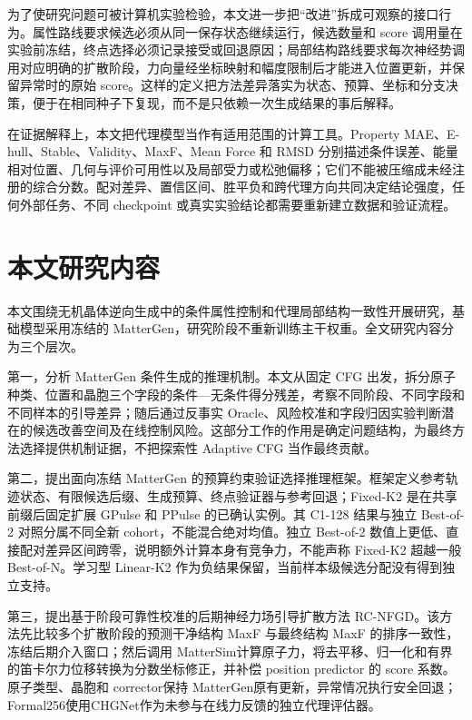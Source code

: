 为了使研究问题可被计算机实验检验，本文进一步把``改进''拆成可观察的接口行为。属性路线要求候选必须从同一保存状态继续运行，候选数量和 score 调用量在实验前冻结，终点选择必须记录接受或回退原因；局部结构路线要求每次神经势调用对应明确的扩散阶段，力向量经坐标映射和幅度限制后才能进入位置更新，并保留异常时的原始 score。这样的定义把方法差异落实为状态、预算、坐标和分支决策，便于在相同种子下复现，而不是只依赖一次生成结果的事后解释。

在证据解释上，本文把代理模型当作有适用范围的计算工具。Property MAE、E-hull、Stable、Validity、MaxF、Mean Force 和 RMSD 分别描述条件误差、能量相对位置、几何与评价可用性以及局部受力或松弛偏移；它们不能被压缩成未经注册的综合分数。配对差异、置信区间、胜平负和跨代理方向共同决定结论强度，任何外部任务、不同 checkpoint 或真实实验结论都需要重新建立数据和验证流程。

\section{本文研究内容}

本文围绕无机晶体逆向生成中的条件属性控制和代理局部结构一致性开展研究，基础模型采用冻结的 MatterGen，研究阶段不重新训练主干权重。全文研究内容分为三个层次。

第一，分析 MatterGen 条件生成的推理机制。本文从固定 CFG 出发，拆分原子种类、位置和晶胞三个字段的条件---无条件得分残差，考察不同阶段、不同字段和不同样本的引导差异；随后通过反事实 Oracle、风险校准和字段归因实验判断潜在的候选改善空间及在线控制风险。这部分工作的作用是确定问题结构，为最终方法选择提供机制证据，不把探索性 Adaptive CFG 当作最终贡献。

第二，提出面向冻结 MatterGen 的预算约束验证选择推理框架。框架定义参考轨迹状态、有限候选后缀、生成预算、终点验证器与参考回退；Fixed-K2 是在共享前缀后固定扩展 GPulse 和 PPulse 的已确认实例。其 C1-128 结果与独立 Best-of-2 对照分属不同全新 cohort，不能混合绝对均值。独立 Best-of-2 数值上更低、直接配对差异区间跨零，说明额外计算本身有竞争力，不能声称 Fixed-K2 超越一般 Best-of-N。学习型 Linear-K2 作为负结果保留，当前样本级候选分配没有得到独立支持。

第三，提出基于阶段可靠性校准的后期神经力场引导扩散方法 RC-NFGD。该方法先比较多个扩散阶段的预测干净结构 MaxF 与最终结构 MaxF 的排序一致性，冻结后期介入窗口；然后调用 Matter\allowbreak Sim计算原子力，将去平移、归一化和有界的笛卡尔力位移转换为分数坐标修正，并补偿 position predictor 的 score 系数。原子类型、晶胞和 corrector保持 MatterGen原有更新，异常情况执行安全回退；Formal256使用CHGNet作为未参与在线力反馈的独立代理评估器。

